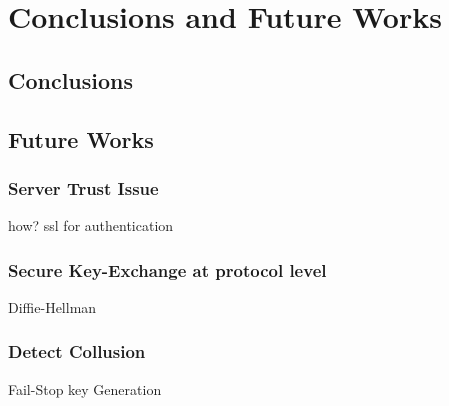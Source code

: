 \chapter{Conclusions and Future Works}

\section{Conclusions}


\section{Future Works}

\subsection{Server Trust Issue}
how? ssl for authentication

\subsection{Secure Key-Exchange at protocol level}
Diffie-Hellman

\subsection{Detect Collusion}
Fail-Stop key Generation